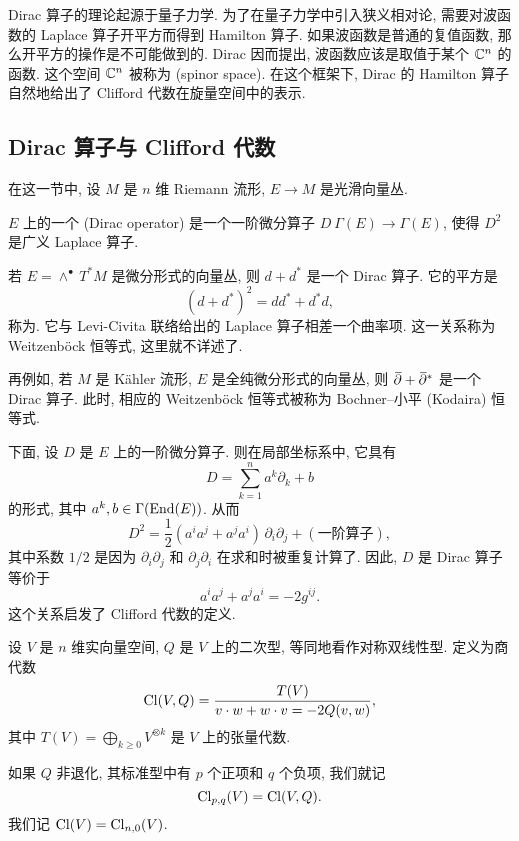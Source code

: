 Dirac 算子的理论起源于量子力学.
为了在量子力学中引入狭义相对论,
需要对波函数的 Laplace 算子开平方而得到 Hamilton 算子.
如果波函数是普通的复值函数, 那么开平方的操作是不可能做到的.
Dirac 因而提出, 波函数应该是取值于某个 $\mathbb{C}^n$ 的函数.
这个空间 $\mathbb{C}^n$ 被称为 (spinor space).
在这个框架下, Dirac 的 Hamilton 算子自然地给出了 Clifford 代数在旋量空间中的表示.


\subsection{Dirac 算子与 Clifford 代数}

在这一节中, 设 $M$ 是 $n$ 维 Riemann 流形, $E \to M$ 是光滑向量丛.

\begin{definition}
    $E$ 上的一个  (Dirac operator) 是一个一阶微分算子
    $D \: \Gamma (E) \to \Gamma (E)$, 使得 $D^2$ 是广义 Laplace 算子.
\end{definition}

\begin{example} \label{eg-8-dirac-d-dstar}
    若 $E = \wedge^\bullet \, T^* M$ 是微分形式的向量丛,
    则 $d + d^*$ 是一个 Dirac 算子. 它的平方是
    \[ (d + d^*)^2 = d d^* + d^* d, \]
    称为.
    它与 Levi-Civita 联络给出的 Laplace 算子相差一个曲率项.
    这一关系称为 Weitzenböck 恒等式, 这里就不详述了.
    
    再例如, 若 $M$ 是 Kähler 流形, $E$ 是全纯微分形式的向量丛,
    则 $\mspace{2mu}\overline{\mspace{-2mu}\partial}{} + \mspace{2mu}\overline{\mspace{-2mu}\partial}{}^*$ 是一个 Dirac 算子. 此时, 相应的
    Weitzenböck 恒等式被称为 Bochner--小平 (Kodaira) 恒等式. \varqed
\end{example}

下面, 设 $D$ 是 $E$ 上的一阶微分算子. 则在局部坐标系中, 它具有
\[ D = \sum_{k=1}^n a^k \partial_k + b \]
的形式, 其中 $a^k, b \in \Gamma( \operatorname{End} (E) )$. 从而
\[ D^2 = \frac12 (a^i a^j + a^j a^i) \, \partial_i \partial_j + (\text{一阶算子}), \]
其中系数 $1/2$ 是因为 $\partial_i \partial_j$ 和 $\partial_j \partial_i$
在求和时被重复计算了. 因此, $D$ 是 Dirac 算子等价于
\[ a^i a^j + a^j a^i = -2 g^{ij}. \]
这个关系启发了 Clifford 代数的定义.

\begin{definition}
    设 $V$ 是 $n$ 维实向量空间, $Q$ 是 $V$ 上的二次型, 等同地看作对称双线性型.
    定义为商代数
    \[ \operatorname{Cl} (V, Q) = \frac {T(V)} {v \cdot w + w \cdot v = -2 Q(v, w)}, \]
    其中 $T(V) = \bigoplus_{k \geq 0} V^{\otimes k}$ 是 $V$ 上的张量代数.
    
    如果 $Q$ 非退化, 其标准型中有 $p$ 个正项和 $q$ 个负项, 我们就记 
    \[ \operatorname{Cl}_{p,q} (V) = \operatorname{Cl} (V, Q). \]
    我们记 $\operatorname{Cl} (V) = \operatorname{Cl}_{n,0} (V)$.
\end{definition}

